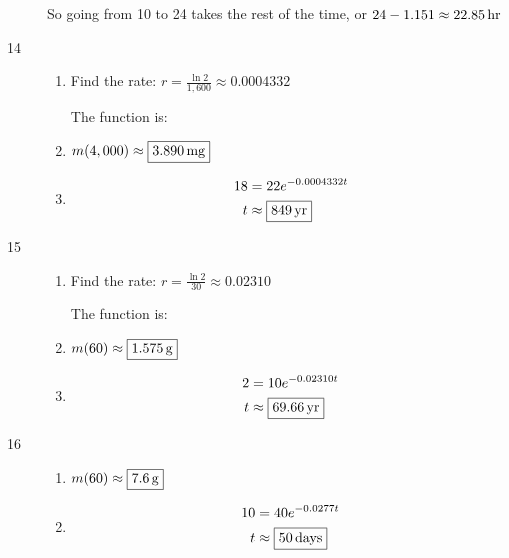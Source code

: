 \documentclass{exam}
\begin{document}
\begin{description}
        So going from 10 to 24 takes the rest of the time, or $24 - 1.151 \approx \unit[22.85]{hr} $

      \item[14] 
        \begin{enumerate}[a]
          \item Find the rate: $r = \frac{\ln 2}{1,600} \approx 0.0004332$

            The function is: 

          \item $m(4,000) \approx \boxed{\unit[3.890]{mg}}$

          \item
            \begin{align*}
              18 & = 22 e^{-0.0004332 t} \\
              t  & \approx \boxed{\unit[849]{yr}} \\
            \end{align*}

        \end{enumerate}

      \item[15] 
        \begin{enumerate}[a]
          \item Find the rate: $r = \frac{\ln 2}{30} \approx 0.02310$

            The function is: 

          \item $m(60) \approx \boxed{\unit[1.575]{g}}$

          \item
            \begin{align*}
              2 & = 10 e^{-0.02310 t} \\
              t  & \approx \boxed{\unit[69.66]{yr}} \\
            \end{align*}

        \end{enumerate}

      \item[16] 
        \begin{enumerate}[a]
          \item $m(60) \approx \boxed{\unit[7.6]{g}}$

          \item
            \begin{align*}
              10 & = 40 e^{-0.0277t} \\
              t  & \approx \boxed{\unit[50]{days}} \\
            \end{align*}


\end{enumerate}
\end{description}
\end{document}
